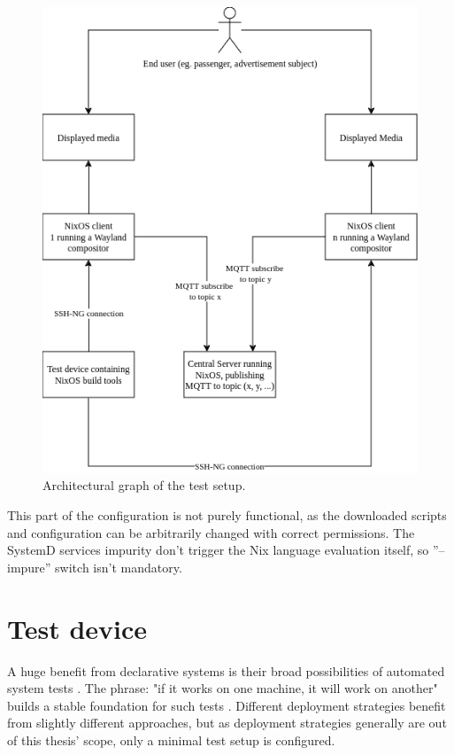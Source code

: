 %
\begin{figure}
    \centering
    \includegraphics[scale=0.8]{latex/kuvat/architecture.drawio.png}
    \caption{Architectural graph of the test setup.}
    \label{parchitecture}
\end{figure}

This part of the configuration is not purely functional, as the downloaded scripts and configuration can be arbitrarily changed with correct permissions. The SystemD services impurity don't trigger the Nix language evaluation itself, so ''--impure'' switch isn't mandatory.

\section{Test device}

A huge benefit from declarative systems is their broad possibilities of automated system tests  \cite{van2010automating}. The phrase: "if it works on one machine, it will work on another" builds a stable foundation for such tests \cite{nixosNixOSManual}. Different deployment strategies benefit from slightly different approaches, but as deployment strategies generally are out of this thesis' scope, only a minimal test setup is configured.

